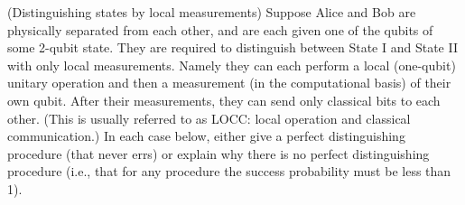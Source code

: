 \begin{questions}
  \question (Distinguishing states by local measurements) Suppose
  Alice and Bob are physically separated from each other, and are each
  given one of the qubits of some 2-qubit state. They are required to
  distinguish between State I and State II with only local
  measurements. Namely they can each perform a local (one-qubit)
  unitary operation and then a measurement (in the computational
  basis) of their own qubit. After their measurements, they can send
  only classical bits to each other. (This is usually referred to as
  LOCC: local operation and classical communication.)  In each case
  below, either give a perfect distinguishing procedure (that never
  errs) or explain why there is no perfect distinguishing procedure
  (i.e., that for any procedure the success probability must be less
  than 1).


\end{questions}



